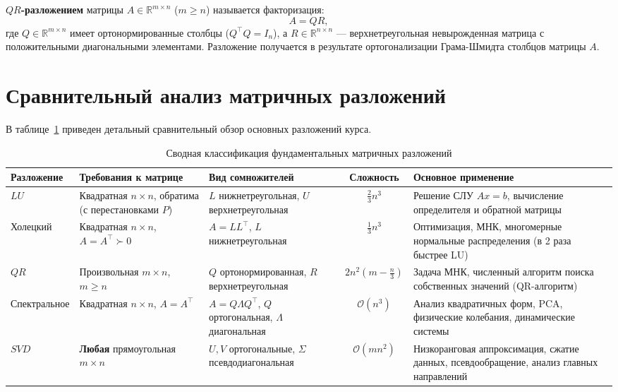     \begin{definition}[QR-decomposition]
\textbf{$QR$-разложением} матрицы $A \in \mathbb{R}^{m \times n}$ ($m \ge n$) называется факторизация:
\[ A = Q R, \]
где $Q \in \mathbb{R}^{m \times n}$ имеет ортонормированные столбцы ($Q^\top Q = I_n$), а $R \in \mathbb{R}^{n \times
n}$ — верхнетреугольная невырожденная матрица с положительными диагональными элементами.
Разложение получается в результате ортогонализации Грама-Шмидта столбцов матрицы $A$.
    \end{definition}

    \section{Сравнительный анализ матричных разложений}

    В таблице~\ref{tab:decompositions} приведен детальный сравнительный обзор основных разложений курса.

    \begin{table}[htbp]
        \centering
        \small
        \begin{tabular}{lp{3.5cm}p{3cm}cp{4cm}}
            \toprule
            \textbf{Разложение} & \textbf{Требования к матрице} & \textbf{Вид сомножителей} & \textbf{Сложность} &
            \textbf{Основное применение} \\ \midrule
            $LU$ & Квадратная $n \times n$, обратима (с перестановками $P$) & $L$ нижнетреугольная, $U$
            верхнетреугольная & $\frac{2}{3} n^3$ & Решение СЛУ $Ax=b$, вычисление определителя и обратной матрицы \\
            \midrule
            Холецкий & Квадратная $n \times n$, $A = A^\top \succ 0$ & $A = L L^\top$, $L$ нижнетреугольная &
            $\frac{1}{3} n^3$ & Оптимизация, МНК, многомерные нормальные распределения (в 2 раза быстрее LU) \\
            \midrule
            $QR$ & Произвольная $m \times n$, $m \ge n$ & $Q$ ортонормированная, $R$ верхнетреугольная
            & $2 n^2 \left(m - \frac{n}{3}\right)$ & Задача МНК, численный алгоритм поиска собственных значений
            (QR-алгоритм) \\ \midrule
            Спектральное & Квадратная $n \times n$, $A = A^\top$
            & $A = Q \Lambda Q^\top$, $Q$ ортогональная, $\Lambda$ диагональная & $\mathcal{O}(n^3)$ & Анализ
            квадратичных форм, PCA, физические колебания, динамические системы \\ \midrule
            $SVD$ & \textbf{Любая} прямоугольная $m \times n$ & $U, V$ ортогональные, $\Sigma$ псевдодиагональная
            & $\mathcal{O}(m n^2)$
            & Низкоранговая аппроксимация, сжатие данных, псевдообращение, анализ главных направлений \\ \bottomrule
        \end{tabular}
        \caption{Сводная классификация фундаментальных матричных разложений}
        \label{tab:decompositions}
    \end{table}

    \newpage

